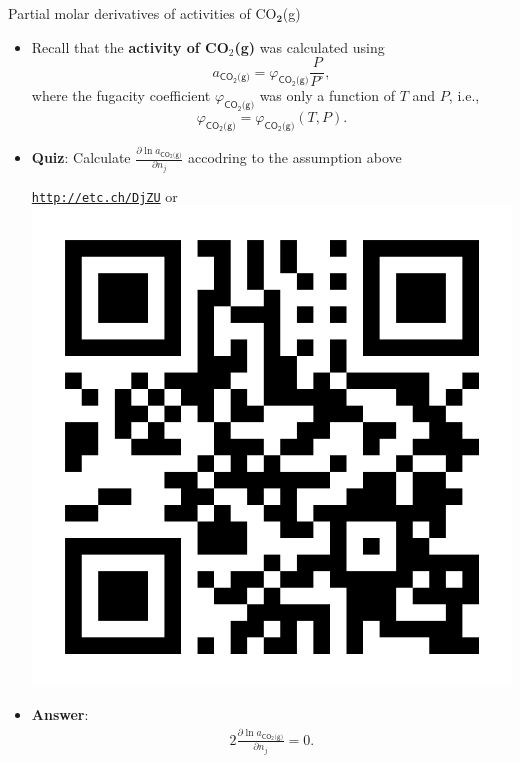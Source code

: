 %
%
%
\begin{frame}{Partial molar derivatives of activities of CO$_{\boldsymbol{2}}$(g)}

\vskip 10pt
\begin{itemize}
\item Recall that the {\bf activity of CO$_{2}$(g)} was calculated using
%
\[
a_{\mathsf{CO_{2}\text{(g)}}}=\varphi_{\mathsf{CO_{2}\text{(g)}}}\frac{P}{P^{\circ}},
\]
%
where the fugacity coefficient $\varphi_{\mathsf{CO_{2}\text{(g)}}}$
was only a function of $T$ and $P$, i.e., 
\[
\varphi_{\mathsf{CO_{2}\text{(g)}}}=\varphi_{\mathsf{CO_{2}\text{(g)}}}(T,P).
\]
\end{itemize}
\begin{itemize}
\hiddenpause
\item \alert{\bf Quiz}: Calculate 
$\frac{\partial\ln a_{\mathsf{CO_{2}\text{(g)}}}}{\partial n_{j}}$ accodring to the assumption above
%
\begin{center}
	\href{http://etc.ch/DjZU}{\textcolor{indigo(dye)}{\tt http://etc.ch/DjZU}} \quad or \quad 
	\includegraphics[height=0.08\columnwidth]{figures/numerical-methods-chemical-equilibrium/polls.png}
\end{center}
%
\hiddenpause
\item \alert{\bf Answer}: 
%
\begin{alignat*}{2}
\tfrac{\partial\ln a_{\mathsf{CO_{2}\text{(g)}}}}{\partial n_{j}} = 0.
\end{alignat*}
\end{itemize}
\end{frame}
%
